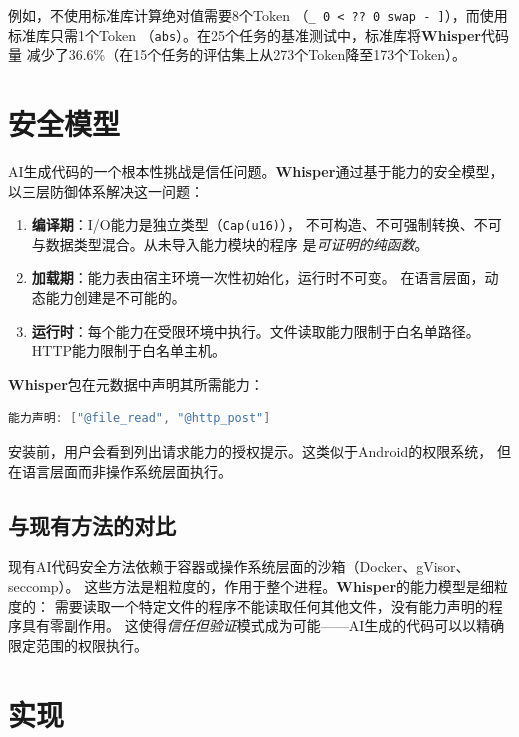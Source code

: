 \documentclass[11pt,a4paper]{ctexart}
\begin{document}
例如，不使用标准库计算绝对值需要8个Token
（\texttt{\_ 0 < ?? 0 swap - ]}），而使用标准库只需1个Token
（\texttt{abs}）。在25个任务的基准测试中，标准库将\textbf{Whisper}代码量
减少了36.6\%（在15个任务的评估集上从273个Token降至173个Token）。

\section{安全模型}
\label{sec:security}

AI生成代码的一个根本性挑战是信任问题。\textbf{Whisper}通过基于能力的安全模型，
以三层防御体系解决这一问题：

\begin{enumerate}
\item \textbf{编译期}：I/O能力是独立类型（\texttt{Cap(u16)}），
  不可构造、不可强制转换、不可与数据类型混合。从未导入能力模块的程序
  是\textit{可证明的纯函数}。
\item \textbf{加载期}：能力表由宿主环境一次性初始化，运行时不可变。
  在语言层面，动态能力创建是不可能的。
\item \textbf{运行时}：每个能力在受限环境中执行。文件读取能力限制于白名单路径。
  HTTP能力限制于白名单主机。
\end{enumerate}

\textbf{Whisper}包在元数据中声明其所需能力：

\begin{lstlisting}[language=C,basicstyle=\ttfamily\small]
能力声明: ["@file_read", "@http_post"]
\end{lstlisting}

安装前，用户会看到列出请求能力的授权提示。这类似于Android的权限系统，
但在语言层面而非操作系统层面执行。

\subsection{与现有方法的对比}

现有AI代码安全方法依赖于容器或操作系统层面的沙箱（Docker、gVisor、seccomp）。
这些方法是粗粒度的，作用于整个进程。\textbf{Whisper}的能力模型是细粒度的：
需要读取一个特定文件的程序不能读取任何其他文件，没有能力声明的程序具有零副作用。
这使得\textit{信任但验证}模式成为可能——AI生成的代码可以以精确限定范围的权限执行。

\section{实现}
\label{sec:implementation}
\end{document}
